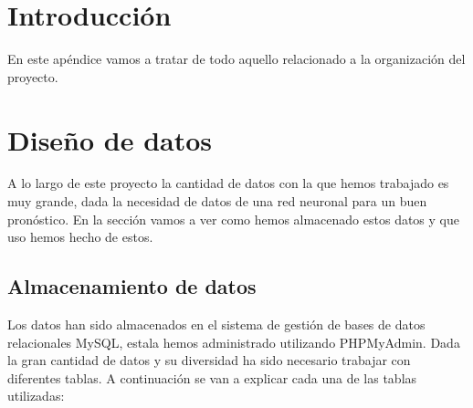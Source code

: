 
\section{Introducción}

En este apéndice vamos a tratar de todo aquello relacionado a la organización del proyecto.

\section{Diseño de datos}

A lo largo de este proyecto la cantidad de datos con la que hemos trabajado es muy grande, dada la necesidad de datos de una red neuronal para un buen pronóstico. En la sección vamos a ver como hemos almacenado estos datos y que uso hemos hecho de estos.

\subsection{Almacenamiento de datos}

Los datos han sido almacenados en el sistema de gestión de bases de datos relacionales MySQL, estala hemos administrado utilizando PHPMyAdmin. Dada la gran cantidad de datos y su diversidad ha sido necesario trabajar con diferentes tablas. A continuación se van a explicar cada una de las tablas utilizadas:

